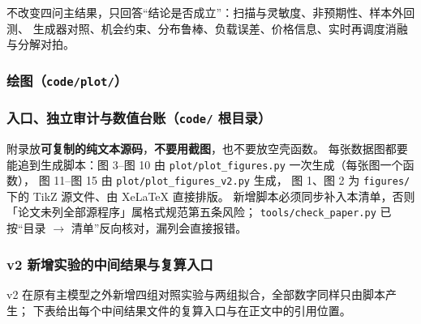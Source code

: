 不改变四问主结果，只回答“结论是否成立”：扫描与灵敏度、非预期性、样本外回测、
生成器对照、机会约束、分布鲁棒、负载误差、价格信息、实时再调度消融与分解对拍。


\subsubsection{绘图（\texttt{code/plot/}）}


\subsubsection{入口、独立审计与数值台账（\texttt{code/} 根目录）}


\begin{guideblock}
附录放\textbf{可复制的纯文本源码}，\textbf{不要用截图}，也不要放空壳函数。
每张数据图都要能追到生成脚本：图 3--图 10 由 \texttt{plot/plot\_figures.py} 一次生成（每张图一个函数），
图 11--图 15 由 \texttt{plot/plot\_figures\_v2.py} 生成，
图 1、图 2 为 \texttt{figures/} 下的 TikZ 源文件、由 XeLaTeX 直接排版。
新增脚本必须同步补入本清单，否则「论文未列全部源程序」属格式规范第五条风险；
\texttt{tools/check\_paper.py} 已按“目录 $\to$ 清单”反向核对，漏列会直接报错。
\end{guideblock}

\subsubsection{v2 新增实验的中间结果与复算入口}

v2 在原有主模型之外新增四组对照实验与两组拟合，全部数字同样只由脚本产生；
下表给出每个中间结果文件的复算入口与在正文中的引用位置。

